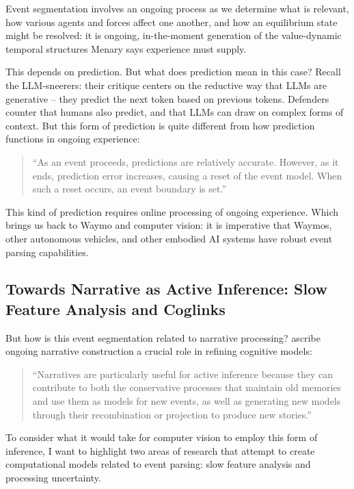 \documentclass[11pt,a4paper]{article}
\begin{document}
Event segmentation involves an ongoing process as we determine what is relevant, how various agents and forces affect one another, and how an equilibrium state might be resolved: it is ongoing, in-the-moment generation of the value-dynamic temporal structures Menary says experience must supply.

This depends on prediction. But what does prediction mean in this case? Recall the LLM-sneerers: their critique centers on the reductive way that LLMs are generative -- they predict the next token based on previous tokens. Defenders counter that humans also predict, and that LLMs can draw on complex forms of context. But this form of prediction is quite different from how prediction functions in ongoing experience:

\begin{quote}
``As an event proceeds, predictions are relatively accurate. However, as it ends, prediction error increases, causing a reset of the event model. When such a reset occurs, an event boundary is set.'' \citep[p.~135]{miller2023eventsweaknarrativity}
\end{quote}

This kind of prediction requires online processing of ongoing experience. Which brings us back to Waymo and computer vision: it is imperative that Waymos, other autonomous vehicles, and other embodied AI systems have robust event parsing capabilities.

\subsection{Towards Narrative as Active Inference: Slow Feature Analysis and Coglinks}
But how is this event segmentation related to narrative processing? \citet{bouizegarene2024narrative} ascribe ongoing narrative construction a crucial role in refining cognitive models:

\begin{quote}
``Narratives are particularly useful for active inference because they can contribute to both the conservative processes that maintain old memories and use them as models for new events, as well as generating new models through their recombination or projection to produce new stories.'' \citep{bouizegarene2024narrative}
\end{quote}

To consider what it would take for computer vision to employ this form of inference, I want to highlight two areas of research that attempt to create computational models related to event parsing: slow feature analysis and processing uncertainty.
\end{document}
